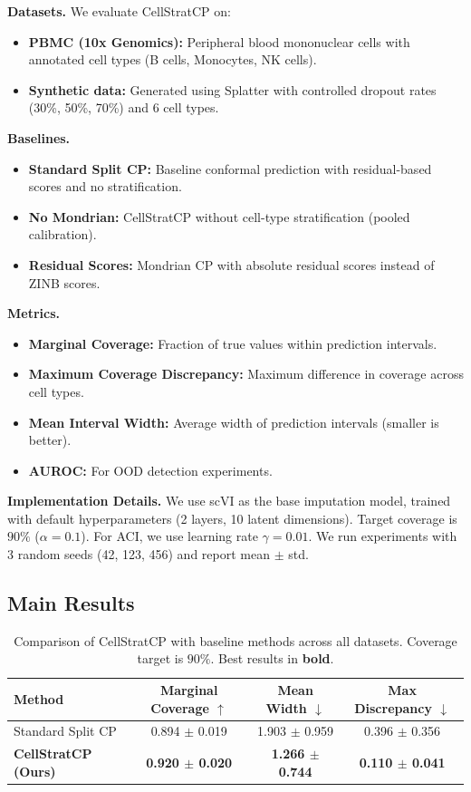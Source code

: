 \documentclass{article}
\begin{document}
\textbf{Datasets.} We evaluate CellStratCP on:
\begin{itemize}
    \item \textbf{PBMC (10x Genomics):} Peripheral blood mononuclear cells with annotated cell types (B cells, Monocytes, NK cells).
    \item \textbf{Synthetic data:} Generated using Splatter with controlled dropout rates (30\%, 50\%, 70\%) and 6 cell types.
\end{itemize}

\textbf{Baselines.}
\begin{itemize}
    \item \textbf{Standard Split CP:} Baseline conformal prediction with residual-based scores and no stratification.
    \item \textbf{No Mondrian:} CellStratCP without cell-type stratification (pooled calibration).
    \item \textbf{Residual Scores:} Mondrian CP with absolute residual scores instead of ZINB scores.
\end{itemize}

\textbf{Metrics.}
\begin{itemize}
    \item \textbf{Marginal Coverage:} Fraction of true values within prediction intervals.
    \item \textbf{Maximum Coverage Discrepancy:} Maximum difference in coverage across cell types.
    \item \textbf{Mean Interval Width:} Average width of prediction intervals (smaller is better).
    \item \textbf{AUROC:} For OOD detection experiments.
\end{itemize}

\textbf{Implementation Details.} We use scVI as the base imputation model, trained with default hyperparameters (2 layers, 10 latent dimensions). Target coverage is $90\%$ ($\alpha = 0.1$). For ACI, we use learning rate $\gamma = 0.01$. We run experiments with 3 random seeds (42, 123, 456) and report mean $\pm$ std.

\subsection{Main Results}

\begin{table}[t]
\caption{Comparison of CellStratCP with baseline methods across all datasets. Coverage target is $90\%$. Best results in \textbf{bold}.}
\label{tab:main}
\centering
\begin{tabular}{lccc}
\toprule
Method & Marginal Coverage $\uparrow$ & Mean Width $\downarrow$ & Max Discrepancy $\downarrow$ \\
\midrule
Standard Split CP & 0.894 $\pm$ 0.019 & 1.903 $\pm$ 0.959 & 0.396 $\pm$ 0.356 \\
\textbf{CellStratCP (Ours)} & \textbf{0.920 $\pm$ 0.020} & \textbf{1.266 $\pm$ 0.744} & \textbf{0.110 $\pm$ 0.041} \\
\bottomrule
\end{tabular}
\end{table}
\end{document}
